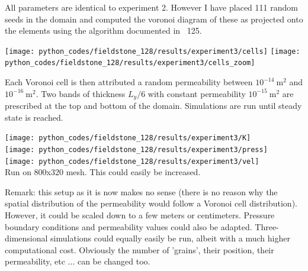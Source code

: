 All parameters are identical to experiment 2. However I have placed
111 random seeds in the domain and computed the voronoi diagram of these 
as projected onto the elements using the algorithm documented in \stone~125.

\begin{center}
\texttt{[image: python\_codes/fieldstone\_128/results/experiment3/cells]}
\texttt{[image: python\_codes/fieldstone\_128/results/experiment3/cells\_zoom]}
\end{center}

Each Voronoi cell is then 
attributed a random permeability between $10^{-14}~\si{\square\meter}$ and $10^{-16}~\si{\square\meter}$.
Two bands of thickness $L_y/6$ with constant permeability $10^{-15}~\si{\square\meter}$ are 
prescribed at the top and bottom of the domain. Simulations are run until steady state is reached. 

\begin{center}
\texttt{[image: python\_codes/fieldstone\_128/results/experiment3/K]}\\
\texttt{[image: python\_codes/fieldstone\_128/results/experiment3/press]}\\
\texttt{[image: python\_codes/fieldstone\_128/results/experiment3/vel]}\\
{\captionfont Run on 800x320 mesh. This could easily be increased.} 
\end{center}

Remark: this setup as it is now makes no sense (there is no reason why the 
spatial distribution of the permeability would follow a Voronoi cell 
distribution). However, it could be scaled down to a few meters or
centimeters. Pressure boundary conditions and permeability values could also be adapted.
Three-dimensional simulations could equally easily be run, albeit with a much higher
computational cost. 
Obviously the number of 'grains', their position, their permeability, etc ... can be 
changed too.


